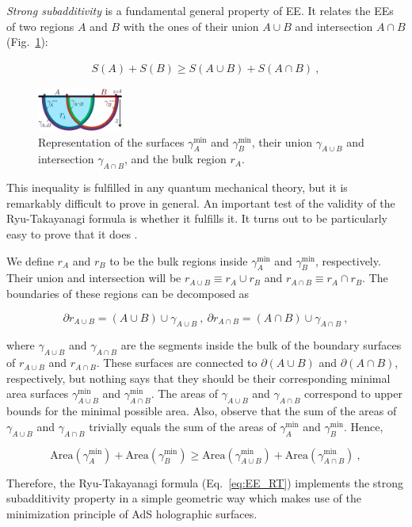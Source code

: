 \documentclass[twocolumn]{revtex4}
\providecommand{\eq}[2]{
    \begin{equation}
        #2
    \label{eq:#1}
    \end{equation}
}
\providecommand{\eqgat}[2]{
    \begin{gather}
        #2
    \label{eq:#1}
    \end{gather}
}
\begin{document}
\emph{Strong subadditivity}  is a fundamental general property of EE. It relates the EEs of two regions $A$ and $B$ with the ones of their union $A \cup B$ and intersection $A \cap B$ %
(Fig.~\ref{fig:SS}):
\eqgat{EE_strong-subadd}{
    S(A) + S(B) \ge S(A \cup B) + S(A \cap B) \ , %
}
\begin{figure}
    \centering
    \includegraphics[width=0.25\textwidth]{../imatges/SS_2-D.png}
\caption{Representation of the surfaces $\gamma_A^\text{min}$ and $\gamma_B^\text{min}$, their union $\gamma_{A \cup B}$ and intersection $\gamma_{A \cap B}$, and the bulk region $r_A$.}
\label{fig:SS}
\end{figure}
This inequality is fulfilled in any quantum mechanical theory, but it is remarkably difficult to prove in general. An important test of the validity of the Ryu-Takayanagi formula is whether it fulfills it. It turns out to be particularly easy to prove that it does \cite{headrick_holographic_2007}.

We define $r_A$ and $r_B$ to be the bulk regions inside $\gamma^{\text{min}}_A$ and $\gamma^{\text{min}}_B$, respectively. Their union and intersection will be $r_{A \cup B} \equiv  r_A \cup r_B$ and $r_{A \cap B} \equiv  r_A \cap r_B$. The boundaries of these regions can be decomposed as
\eq{SS_dr-1}{
    \partial r_{A \cup B} = (A \cup B) \cup \gamma_{A \cup B} \ , \ \partial r_{A \cap B } = (A \cap B) \cup \gamma_{A \cap B} \ , \nonumber
}
where $\gamma_{A \cup B}$ and $\gamma_{A \cap B}$ are the segments inside the bulk of the boundary surfaces of $r_{A \cup B}$ and $r_{A \cap B}$. These surfaces are connected to $\partial (A \cup B)$ and $\partial (A \cap B)$, respectively, but nothing says that they should be their corresponding minimal area surfaces $\gamma^{\text{min}}_{A \cup B}$ and $\gamma^{\text{min}}_{A \cap B}$. The areas of $\gamma_{A \cup B}$ and $\gamma_{A \cap B}$ correspond to upper bounds for the minimal possible area. Also, observe that the sum of the areas of $\gamma_{A \cup B}$ and $\gamma_{A \cap B}$ trivially equals the sum of the areas of $\gamma^{\text{min}}_A$ and $\gamma^{\text{min}}_B$. Hence,
\eq{SS_gamma-1}{
    {\text{Area}}(\gamma^{\text{min}}_A) + {\text{Area}}(\gamma^{\text{min}}_B) %
    \ge   {\text{Area}}(\gamma^{\text{min}}_{A \cup B}) +   {\text{Area}}(\gamma^{\text{min}}_{A \cap B}) \ , \nonumber
}
Therefore, the Ryu-Takayanagi formula (Eq.~\ref{eq:EE_RT}) implements the strong subadditivity property in a simple geometric way which makes use of the minimization principle of AdS holographic surfaces. %
\end{document}

